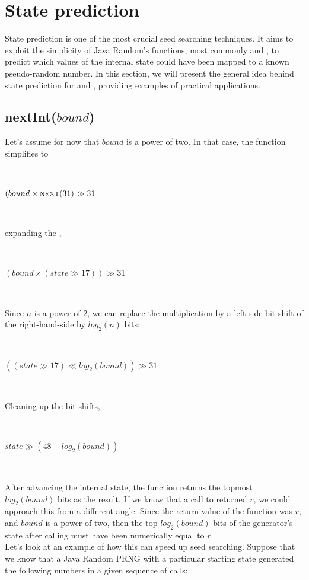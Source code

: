 \documentclass{article}
\begin{document}
\section{State prediction}

State prediction is one of the most crucial seed searching techniques. It aims to exploit the simplicity of Java Random’s functions, most commonly  and , to predict which values of the internal state could have been mapped to a known pseudo-random number. In this section, we will present the general idea behind state prediction for  and , providing examples of practical applications.

\subsection{ nextInt($bound$) }

Let’s assume for now that $bound$ is a power of two. In that case, the function simplifies to

\
\begin{algorithmic}
    \State \Return $(bound \times \Call{next}{31} \gg 31$
\EndFunction
\end{algorithmic}
\ \

\noindent expanding the \Call{next}{31},

\
\begin{algorithmic}
\Function{nextInt}{$bound$}
    \State \Call{nextSeed}{}
    \State \Return $(bound \times (state \gg 17)) \gg 31$
\EndFunction
\end{algorithmic}
\ \

\noindent Since $n$ is a power of 2, we can replace the multiplication by a left-side bit-shift of the right-hand-side by $log_2(n)$ bits:

\
\begin{algorithmic}
    \State {}
    \State \Return $((state \gg 17) \ll log_2(bound)) \gg 31$
\EndFunction
\end{algorithmic}
\ \

\noindent Cleaning up the bit-shifts,

\
\begin{algorithmic}
    \State {}
    \State \Return $state \gg (48 - log_2(bound))$
\EndFunction
\end{algorithmic}
\ \

After advancing the internal state, the function returns the topmost \\$log_2(bound)$ bits as the result. If we know that a call to  returned $r$, we could approach this from a different angle. Since the return value of the function was $r$, and $bound$ is a power of two, then the top $log_2(bound)$ bits of the generator’s state after calling  must have been numerically equal to $r$. \\
Let’s look at an example of how this can speed up seed searching. Suppose that we know that a Java Random PRNG with a particular starting state generated the following numbers in a given sequence of calls:
\end{document}

